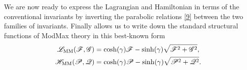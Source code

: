 We are now ready to express the Lagrangian and Hamiltonian in terms of the conventional invariants by inverting the parabolic relations \eqref{9} between the two families of invariants. Finally allows us to write down the standard structural functions of ModMax theory in this best-known form
\begin{subequations}\label{34}
	\begin{align}
  \mathscr{L}_{\rm MM}(\mathscr{F},\mathscr{G})&=\cosh(\gamma)\mathscr{F}-\sinh(\gamma)\sqrt{\mathscr{F}^2+\mathscr{G}^2},\\
  \mathscr{H}_{\rm MM}(\mathscr{P},\mathscr{Q})&=\cosh(\gamma)\mathscr{P}-\sinh(\gamma)\sqrt{\mathscr{P}^2+\mathscr{Q}^2}.
\end{align}
\end{subequations}
































